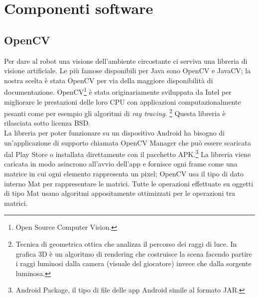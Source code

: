 \chapter{Componenti software}
\fancyfoot[C]{\thepage } 
\section {OpenCV}
Per dare al robot una visione dell'ambiente circostante ci serviva una libreria di 
visione artificiale. Le più famose disponibili per Java sono OpenCV e JavaCV; 
la nostra scelta è stata OpenCV per via della maggiore disponibilità di documentazione. 
OpenCV\footnote{Open Source Computer Vision.} è stata originariamente sviluppata 
da Intel per migliorare le prestazioni delle loro CPU con applicazioni
computazionalmente pesanti come per esempio gli algoritmi di \textit{ray tracing}.
\footnote{Tecnica di geometrica ottica che analizza il percorso dei raggi di luce.
In grafica 3D è un algoritmo di rendering che costruisce la scena facendo
partire i raggi luminosi dalla camera (visuale del giocatore) invece che dalla 
sorgente luminosa.\cite{ray_tracing}} Questa libreria è rilasciata sotto licenza BSD. 
\\La libreria per poter funzionare su un 
dispositivo Android ha bisogno di un'applicazione di supporto chiamata OpenCV 
Manager che può essere scaricata dal Play Store o installata direttamente con il
pacchetto APK.\footnote{Android Package, il tipo di file delle app Android simile 
al formato JAR.} La libreria viene caricata in modo asincrono all'avvio dell'app
e fornisce ogni frame come una matrice in cui ogni elemento rappresenta un pixel; 
OpenCV usa il tipo di dato interno Mat per rappresentare le matrici.
Tutte le operazioni effettuate su oggetti di tipo Mat usano algoritmi appositamente 
ottimizzati per le operazioni tra matrici. 

